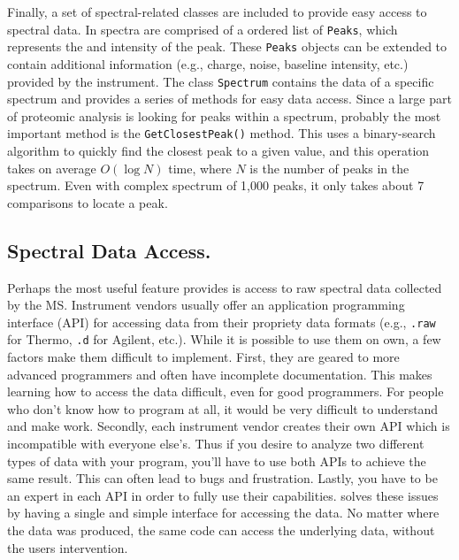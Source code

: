 Finally, a set of spectral-related classes are included to provide easy access to spectral data. In \csmsl{} spectra are comprised of a ordered list of \texttt{Peaks}, which represents the \mz{} and intensity of the peak. These \texttt{Peaks} objects can be extended to contain additional information (e.g., charge, noise, baseline intensity, etc.) provided by the instrument. The class \texttt{Spectrum} contains the data of a specific spectrum and provides a series of methods for easy data access. Since a large part of proteomic analysis is looking for peaks within a spectrum, probably the most important method is the \texttt{GetClosestPeak()} method. This uses a binary-search algorithm to quickly find the closest peak to a given \mz{} value, and this operation takes on average $O(\log N)$ time, where $N$ is the number of peaks in the spectrum. Even with complex spectrum of 1,000 peaks, it only takes about 7 comparisons to locate a peak.

\subsection*{Spectral Data Access.}
Perhaps the most useful feature \csmsl{} provides is access to raw spectral data collected by the MS. Instrument vendors usually offer an application programming interface (API) for accessing data from their propriety data formats (e.g., \texttt{.raw} for Thermo, \texttt{.d} for Agilent, etc.). While it is possible to use them on own, a few factors make them difficult to implement. First, they are geared to more advanced programmers and often have incomplete documentation. This makes learning how to access the data difficult, even for good programmers. For people who don't know how to program at all, it would be very difficult to understand and make work. Secondly, each instrument vendor creates their own API which is incompatible with everyone else's. Thus if you desire to analyze two different types of data with your program, you'll have to use both APIs to achieve the same result. This can often lead to bugs and frustration. Lastly, you have to be an expert in each API in order to fully use their capabilities. \csmsl{} solves these issues by having a single and simple interface for accessing the data. No matter where the data was produced, the same code can access the underlying data, without the users intervention. 


